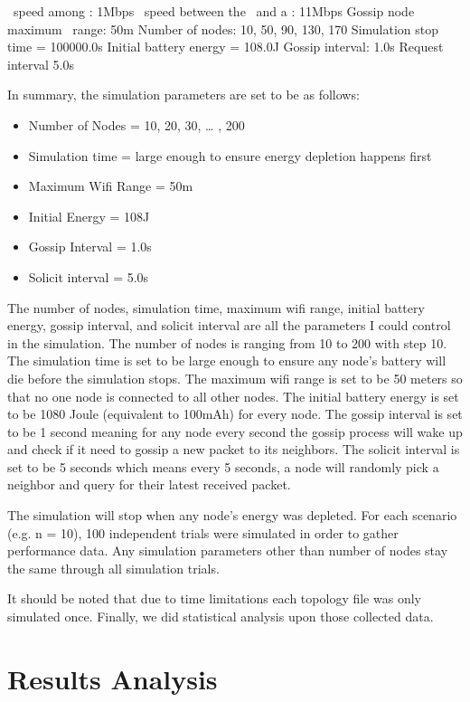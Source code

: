 \wf ~speed among \gns: 1Mbps
\wf ~speed between the \sn ~and a \gn: 11Mbps
Gossip node maximum \wf ~range: 50m
Number of nodes: 10, 50, 90, 130, 170
Simulation stop time = 100000.0s
Initial battery energy = 108.0J
Gossip interval: 1.0s
Request interval 5.0s

In summary, the simulation parameters are set to be as follows:
\begin{itemize}
	\item Number of Nodes = 10, 20, 30, … , 200
	\item Simulation time = large enough to ensure energy depletion happens first
	\item Maximum Wifi Range = 50m
	\item Initial Energy = 108J
	\item Gossip Interval = 1.0s
	\item Solicit interval = 5.0s 
\end{itemize}

The number of nodes, simulation time, maximum wifi range, initial battery energy, gossip interval, and solicit interval are all the parameters I could control in the simulation. The number of nodes is ranging from 10 to 200 with step 10. The simulation time is set to be large enough to ensure any node's battery will die before the simulation stops. The maximum wifi range is set to be 50 meters so that no one node is connected to all other nodes. The initial battery energy is set to be 1080 Joule (equivalent to 100mAh) for every node. The gossip interval is set to be 1 second meaning for any node every second the gossip process will wake up and check if it need to gossip a new packet to its neighbors. The solicit interval is set to be 5 seconds which means every 5 seconds, a node will randomly pick a neighbor and query for their latest received packet. 

The simulation will stop when any node's energy was depleted. For each scenario (e.g. n = 10), 100 independent trials were simulated in order to gather performance data. Any simulation parameters other than number of nodes stay the same through all simulation trials. 



It should be noted that due to time limitations each topology file was only simulated once. Finally, we did statistical analysis upon those collected data.



\section{Results Analysis}

